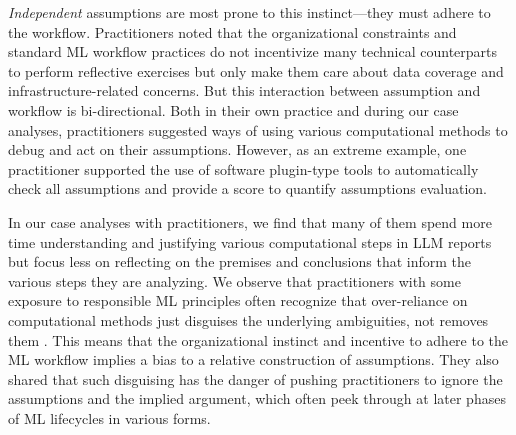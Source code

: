 \textit{Independent} assumptions are most prone to this instinct---they must adhere to the workflow. Practitioners noted that the organizational constraints and standard ML workflow practices do not incentivize many technical counterparts to perform reflective exercises but only make them care about data coverage and infrastructure-related concerns. But this interaction between assumption and workflow is bi-directional. Both in their own practice and during our case analyses, practitioners suggested ways of using various computational methods \cite{yanga2024exploratory,zhang2018empirical} to debug and act on their assumptions. However, as an extreme example, one practitioner supported the use of software plugin-type tools to automatically check all assumptions and provide a score to quantify assumptions evaluation. 

In our case analyses with practitioners, we find that many of them spend more time understanding and justifying various computational steps in LLM reports but focus less on reflecting on the premises and conclusions that inform the various steps they are analyzing. We observe that practitioners with some exposure to responsible ML principles often recognize that over-reliance on computational methods just disguises the underlying ambiguities, not removes them \cite{green2018myth,fazelpour2020algorithmic}. This means that the organizational instinct and incentive to adhere to the ML workflow implies a bias to a relative construction of assumptions. They also shared that such disguising has the danger of pushing practitioners to ignore the assumptions and the implied argument, which often peek through at later phases of ML lifecycles in various forms. 

\begin{quote}
    \textit{}
\end{quote}

